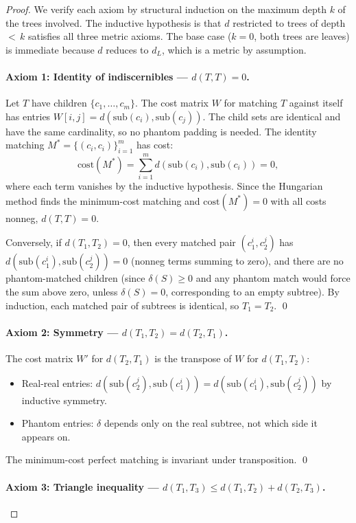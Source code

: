 \documentclass[11pt]{article}
\newcommand{\sub}{\mathrm{sub}}
\newcommand{\cost}{\mathrm{cost}}
\begin{document}
\begin{proof}
We verify each axiom by structural induction on the maximum depth $k$ of
the trees involved. The inductive hypothesis is that $d$ restricted to
trees of depth ${<}\,k$ satisfies all three metric axioms. The base case
($k = 0$, both trees are leaves) is immediate because $d$ reduces to
$d_L$, which is a metric by assumption.

\paragraph{Axiom 1: Identity of indiscernibles --- $d(T, T) = 0$.}

Let $T$ have children $\{c_1, \ldots, c_m\}$. The cost matrix $W$ for
matching $T$ against itself has entries $W[i,j] = d(\sub(c_i),
\sub(c_j))$. The child sets are identical and have the same cardinality,
so no phantom padding is needed. The identity matching $M^* = \{(c_i,
c_i)\}_{i=1}^{m}$ has cost:
\[
  \cost(M^*) = \sum_{i=1}^m d(\sub(c_i), \sub(c_i)) = 0,
\]
where each term vanishes by the inductive hypothesis. Since the Hungarian
method finds the minimum-cost matching and $\cost(M^*) = 0$ with all
costs nonneg, $d(T, T) = 0$.

Conversely, if $d(T_1, T_2) = 0$, then every matched pair $(c_1^i,
c_2^j)$ has $d(\sub(c_1^i), \sub(c_2^j)) = 0$ (nonneg terms summing to
zero), and there are no phantom-matched children (since $\delta(S) \ge
0$ and any phantom match would force the sum above zero, unless
$\delta(S) = 0$, corresponding to an empty subtree). By induction, each
matched pair of subtrees is identical, so $T_1 = T_2$. \qed

\paragraph{Axiom 2: Symmetry --- $d(T_1, T_2) = d(T_2, T_1)$.}

The cost matrix $W'$ for $d(T_2, T_1)$ is the transpose of $W$ for
$d(T_1, T_2)$:
\begin{itemize}[nosep]
  \item Real-real entries: $d(\sub(c_2^j), \sub(c_1^i)) = d(\sub(c_1^i),
    \sub(c_2^j))$ by inductive symmetry.
  \item Phantom entries: $\delta$ depends only on the real subtree, not
    which side it appears on.
\end{itemize}
The minimum-cost perfect matching is invariant under transposition. \qed

\paragraph{Axiom 3: Triangle inequality --- $d(T_1, T_3) \le d(T_1, T_2)
+ d(T_2, T_3)$.}


\end{proof}
\end{document}
